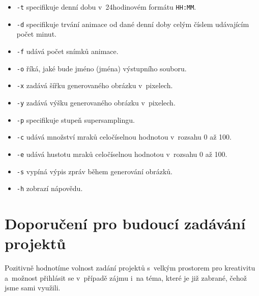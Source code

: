 \documentclass[12pt,a4paper,titlepage,final]{report}
\begin{document}
\begin{itemize}
\item {\tt -t} specifikuje denní dobu v~24hodinovém formátu {\tt HH:MM}.
\item {\tt -d} specifikuje trvání animace od dané denní doby celým číslem udávajícím počet minut.
\item {\tt -f} udává počet snímků animace.
\item {\tt -o} říká, jaké bude jméno (jména) výstupního souboru.
\item {\tt -x} zadává šířku generovaného obrázku v~pixelech.
\item {\tt -y} zadává výšku generovaného obrázku v~pixelech.
\item {\tt -p} specifikuje stupeň supersamplingu.
\item {\tt -c} udává množství mraků celočíselnou hodnotou v~rozsahu 0 až 100.
\item {\tt -e} udává hustotu mraků celočíselnou hodnotou v~rozsahu 0 až 100.
\item {\tt -s} vypíná výpis zpráv během generování obrázků.
\item {\tt -h} zobrazí nápovědu.
\end{itemize}

\chapter{Doporučení pro budoucí zadávání projektů}

Pozitivně hodnotíme volnost zadání projektů s~velkým prostorem pro
kreativitu a~možnost přihlásit se v~případě zájmu i~na téma, které je již
zabrané, čehož jsme sami využili.




\nocite{cite1}
\nocite{cite2}


\end{document}
